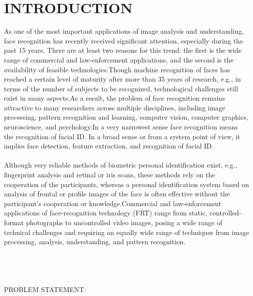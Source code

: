 \documentclass[10pt,a4paper]{article}
\begin{document}
\section{INTRODUCTION}
As one of the most important applications of image analysis and understanding,
face recognition has recently received significant attention, especially during the
past 15 years. There are at least two reasons for this trend: the first is the wide range
of commercial and law-enforcement applications, and the second is the availability
of feasible technologies.Though machine recognition of faces has reached a certain level of maturity
after more than 35 years of research, e.g., in terms of the number of subjects to
be recognized, technological challenges still exist in many aspects.As a
result, the problem of face recognition remains attractive to many researchers
across multiple disciplines, including image processing, pattern recognition and
learning, computer vision, computer graphics, neuroscience, and psychology.In a very narrowest sense face recognition means the recognition of facial ID. In a broad sense or from a system
point of view, it implies face detection, feature extraction, and recognition of
facial ID.\\ \\

Although very reliable methods of biometric personal identification exist, e.g.,
fingerprint analysis and retinal or iris scans, these methods rely on the cooperation
of the participants, whereas a personal identification system based on analysis of
frontal or profile images of the face is often effective without the participant’s
cooperation or knowledge.Commercial and law-enforcement applications of face-recognition technology
(FRT) range from static, controlled-format photographs to uncontrolled video
images, posing a wide range of technical challenges and requiring an equally wide
range of techniques from image processing, analysis, understanding, and pattern
recognition.\\ \\
\\ \\ \\ 
PROBLEM STATEMENT: \\
\end{document}
